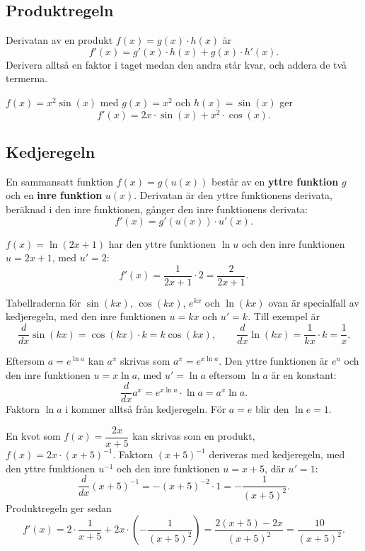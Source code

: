 \subsection{Produktregeln}
\label{c13:sec:produktregeln}
Derivatan av en produkt $f(x) = g(x) \cdot h(x)$ är
\[
  f'(x) = g'(x) \cdot h(x) + g(x) \cdot h'(x).
\]
Derivera alltså en faktor i taget medan den andra står kvar, och addera de två termerna.

\begin{exempel}
$f(x) = x^2 \sin(x)$ med $g(x) = x^2$ och $h(x) = \sin(x)$ ger
\[
  f'(x) = 2x \cdot \sin(x) + x^2 \cdot \cos(x).
\]
\end{exempel}

\subsection{Kedjeregeln}
\label{c13:sec:kedjeregeln}
En sammansatt funktion $f(x) = g(u(x))$ består av en \textbf{yttre funktion} $g$ och en
\textbf{inre funktion} $u(x)$. Derivatan är den yttre funktionens derivata, beräknad i den inre
funktionen, gånger den inre funktionens derivata:
\[
  f'(x) = g'(u(x)) \cdot u'(x).
\]

\begin{exempel}
$f(x) = \ln(2x + 1)$ har den yttre funktionen $\ln u$ och den inre funktionen $u = 2x + 1$, med
$u' = 2$:
\[
  f'(x) = \frac{1}{2x + 1} \cdot 2 = \frac{2}{2x + 1}.
\]
\end{exempel}

Tabellraderna för $\sin(kx)$, $\cos(kx)$, $e^{kx}$ och $\ln(kx)$ ovan är specialfall av
kedjeregeln, med den inre funktionen $u = kx$ och $u' = k$. Till exempel är
\[
  \frac{d}{dx}\sin(kx) = \cos(kx) \cdot k = k\cos(kx), \qquad
  \frac{d}{dx}\ln(kx) = \frac{1}{kx} \cdot k = \frac{1}{x}.
\]

\begin{exempel}[Derivatan av $a^x$]
Eftersom $a = e^{\ln a}$ kan $a^x$ skrivas som $a^x = e^{x \ln a}$. Den yttre funktionen är $e^u$
och den inre funktionen $u = x \ln a$, med $u' = \ln a$ eftersom $\ln a$ är en konstant:
\[
  \frac{d}{dx}a^x = e^{x \ln a} \cdot \ln a = a^x \ln a.
\]
Faktorn $\ln a$ i  kommer alltså från kedjeregeln. För $a = e$ blir den
$\ln e = 1$.
\end{exempel}

\begin{exempel}
En kvot som $f(x) = \dfrac{2x}{x + 5}$ kan skrivas som en produkt, $f(x) = 2x \cdot (x + 5)^{-1}$.
Faktorn $(x + 5)^{-1}$ deriveras med kedjeregeln, med den yttre funktionen $u^{-1}$ och den inre
funktionen $u = x + 5$, där $u' = 1$:
\[
  \frac{d}{dx}(x + 5)^{-1} = -(x + 5)^{-2} \cdot 1 = -\frac{1}{(x + 5)^2}.
\]
Produktregeln ger sedan
\[
  f'(x) = 2 \cdot \frac{1}{x + 5} + 2x \cdot \left(-\frac{1}{(x + 5)^2}\right)
  = \frac{2(x + 5) - 2x}{(x + 5)^2} = \frac{10}{(x + 5)^2}.
\]
\end{exempel}


